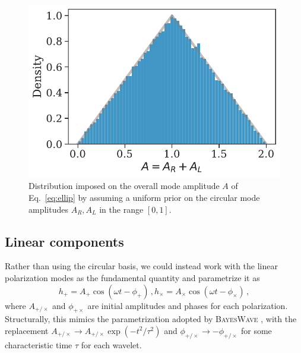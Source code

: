 \documentclass[aps,prd,twocolumn,superscriptaddress,preprintnumbers,floatfix,nofootinbib]{revtex4-2}
\begin{document}
\begin{figure}
\includegraphics[width=\columnwidth]{jac_Aellip_RL}
\caption{Distribution imposed on the overall mode amplitude $A$ of Eq.~\eqref{eq:ellip} by assuming a uniform prior on the circular mode amplitudes $A_R, A_L$ in the range $[0, 1]$.}
\label{fig:jac_rl}
\end{figure}


\subsection{Linear components}

Rather than using the circular basis, we could instead work with the linear polarization modes as the fundamental quantity and parametrize it as
\begin{subequations} \label{eq:Aphi}
\begin{equation}
h_+ = A_+ \cos (\omega t - \phi_+)\, ,
\end{equation}
\begin{equation}
h_\times = A_\times \cos (\omega t - \phi_\times) \, ,
\end{equation}
\end{subequations}
where $A_{+/\times}$ and $\phi_{+\times}$ are initial amplitudes and phases for each polarization.
Structurally, this mimics the parametrization adopted by \textsc{BayesWave} \cite{Cornish:2020dwh}, with the replacement $A_{+/\times} \to A_{+/\times} \exp\left(-t^2/\tau^2\right)$ and $\phi_{+/\times} \to -\phi_{+/\times}$ for some characteristic time $\tau$ for each wavelet.
\end{document}
